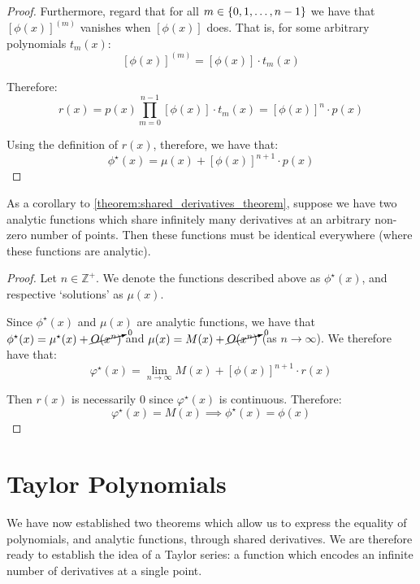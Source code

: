 \begin{theorem}
\begin{proof}
        Furthermore, regard that for all $m\in\{0,1,\dots,n-1\}$ we have that $[\phi(x)]^{(m)}$ vanishes when $[\phi(x)]$ does. That is, for some arbitrary polynomials $t_m(x)$:
        $$
            [\phi(x)]^{(m)}=[\phi(x)]\cdot t_m(x)
        $$

        Therefore:
        $$
            r(x) = p(x)\prod_{m=0}^{n-1}{[\phi(x)]\cdot t_{m}(x)} = [\phi(x)]^{n}\cdot p(x)
        $$

        Using the definition of $r(x)$, therefore, we have that:
        $$
            \phi^\star(x) = \mu(x) + [\phi(x)]^{n+1}\cdot p(x)
        $$
    \end{proof}
\end{theorem}

\begin{theorem}
    \label{theorem:analytic_function_equality}
    As a corollary to \ref{theorem:shared_derivatives_theorem}, suppose we have two analytic functions which share infinitely many derivatives at an arbitrary non-zero number of points. Then these functions must be identical everywhere (where these functions are analytic).

    \begin{proof}
        Let $n\in\mathbb{Z}^+$. We denote the functions described above as $\phi^\star(x)$, and respective `solutions' as $\mu(x)$.

        Since $\phi^\star(x)$ and $\mu(x)$ are analytic functions, we have that $\phi^\star(x)=\mu^\star(x)+\cancelto{0}{O(x^n)}$ and $\mu(x)=M(x)+\cancelto{0}{O(x^n)}$ (as $n\to\infty$). We therefore have that:
        $$
            \varphi^\star(x) = \lim_{n\to\infty}{M(x) + [\phi(x)]^{n+1}\cdot r(x)}
        $$

        Then $r(x)$ is necessarily $0$ since $\varphi^\star(x)$ is continuous. Therefore:
        $$
            \varphi^\star(x) = M(x) \implies \phi^\star(x) = \phi(x)
        $$
    \end{proof}
\end{theorem}

\section{Taylor Polynomials}
We have now established two theorems which allow us to express the equality of polynomials, and analytic functions, through shared derivatives. We are therefore ready to establish the idea of a Taylor series: a function which encodes an infinite number of derivatives at a single point.

